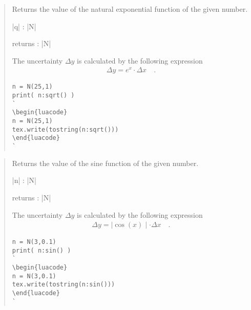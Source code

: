 \documentclass{ltxdoc}
\begin{document}
\begin{quote}
  Returns the value of the natural exponential function of the given number.

  \begin{description}
  \item |q| : |N|

  \item returns : |N|
  \end{description}

  The uncertainty $\Delta y$ is calculated by the following expression
  \begin{align*}
    \Delta y = e^x \cdot \Delta x \quad.
  \end{align*}


\begin{lstlisting}
n = N(25,1)
print( n:sqrt() )
`
\begin{luacode}
n = N(25,1)
tex.write(tostring(n:sqrt()))
\end{luacode}
`
\end{lstlisting}

\end{quote}



\begin{quote}
  Returns the value of the sine function of the given number.

  \begin{description}
  \item |n| : |N|

  \item returns : |N|
  \end{description}

  The uncertainty $\Delta y$ is calculated by the following expression
  \begin{align*}
    \Delta y = \mid \cos(x) \mid \cdot \Delta x \quad.
  \end{align*}


\begin{lstlisting}
n = N(3,0.1)
print( n:sin() )
`
\begin{luacode}
n = N(3,0.1)
tex.write(tostring(n:sin()))
\end{luacode}
`
\end{lstlisting}

\end{quote}
\end{document}
